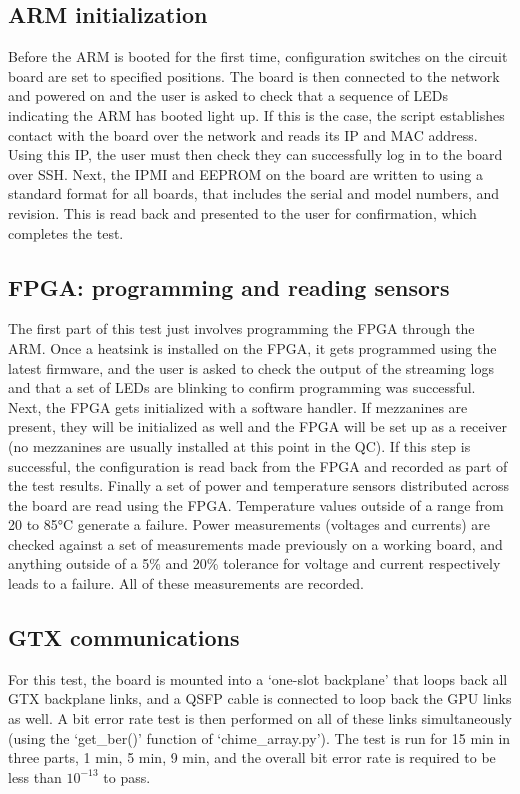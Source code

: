 \documentclass[11pt,article]{memoir}
\begin{document}
\subsection{ARM initialization}
Before the ARM is booted for the first time, configuration switches on the circuit board  are set to specified positions. The board is then connected to the network and powered on and the user is asked to check that a sequence of LEDs indicating the ARM has booted light up. If this is the case, the script establishes contact with the board over the network and reads its IP and MAC address. Using this IP, the user must then check they can successfully log in to the board over SSH. Next, the IPMI and EEPROM on the board are written to using a standard format for all boards, that includes the serial and model numbers, and revision. This is read back and presented to the user for confirmation, which completes the test.


\subsection{FPGA: programming and reading sensors}
\label{subsec:fpga}
The first part of this test just involves programming the FPGA through the ARM. Once a heatsink is installed on the FPGA, it gets programmed using the latest firmware, and the user is asked to check the output of the streaming logs and that a set of LEDs are blinking to confirm programming was successful. Next, the FPGA gets initialized with a software handler. If mezzanines are present, they will be initialized as well and the FPGA will be set up as a receiver (no mezzanines are usually installed at this point in the QC). If this step is successful, the configuration is read back from the FPGA and recorded as part of the test results. Finally a set of power and temperature sensors distributed across the board are read using the FPGA. Temperature values outside of a range from 20 to 85°C generate a failure. Power measurements (voltages and currents) are checked against a set of measurements made previously on a working board, and anything outside of a 5\% and 20\% tolerance for voltage and current respectively leads to a failure. All of these measurements are recorded.


\subsection{GTX communications}
For this test, the board is mounted into a `one-slot backplane' that loops back all GTX backplane links, and a QSFP cable is connected to loop back the GPU links as well. A bit error rate test is then performed on all of these links simultaneously (using the `get\_ber()' function of `chime\_array.py'). The test is run for 15 min in three parts, 1 min, 5 min, 9 min, and the overall bit error rate is required to be less than $10^{-13}$ to pass.
\end{document}
